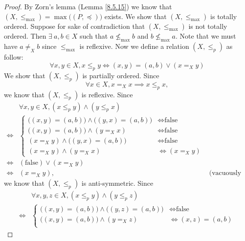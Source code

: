 \begin{proof}
    By Zorn's lemma (Lemma \ref{8.5.15}) we know that \((X, \leq_{\max}) = \max\big((P, \preceq)\big)\) exists.
    We show that \((X, \leq_{\max})\) is totally ordered.
    Suppose for sake of contradiction that \((X, \leq_{\max})\) is not totally ordered.
    Then \(\exists\ a, b \in X\) such that \(a \not\leq_{\max} b\) and \(b \not\leq_{\max} a\).
    Note that we must have \(a \neq_X b\) since \(\leq_{\max}\) is reflexive.
    Now we define a relation \((X, \leq_p)\) as follow:
    \[
        \forall x, y \in X, x \leq_p y \iff (x, y) = (a, b) \lor (x =_X y)
    \]
    We show that \((X, \leq_p)\) is partially ordered.
    Since
    \[
        \forall x \in X, x =_X x \implies x \leq_p x,
    \]
    we know that \((X, \leq_p)\) is reflexive.
    Since
    \begin{align*}
             & \forall x, y \in X, (x \leq_p y) \land (y \leq_p x)                                                        \\
        \iff & \begin{cases}
                   \big((x, y) = (a, b)\big) \land \big((y, x) = (a, b)\big) & \iff \text{false} \\
                   \big((x, y) = (a, b)\big) \land (y =_X x)                 & \iff \text{false} \\
                   (x =_X y) \land \big((y, x) = (a, b)\big)                 & \iff \text{false} \\
                   (x =_X y) \land (y =_X x)                                 & \iff (x =_X y)
               \end{cases}                              \\
        \iff & (\text{false}) \lor (x =_X y)                                                                              \\
        \iff & (x =_X y),                                                                       & \text{(vacuously true)}
    \end{align*}
    we know that \((X, \leq_p)\) is anti-symmetric.
    Since
    \begin{align*}
             & \forall x, y, z \in X, (x \leq_p y) \land (y \leq_p z)                                                        \\
        \iff & \begin{cases}
                   \big((x, y) = (a, b)\big) \land \big((y, z) = (a, b)\big) & \iff \text{false}    \\
                   \big((x, y) = (a, b)\big) \land (y =_X z)                 & \iff (x, z) = (a, b) \\

\end{cases}
\end{align*}
\end{proof}
